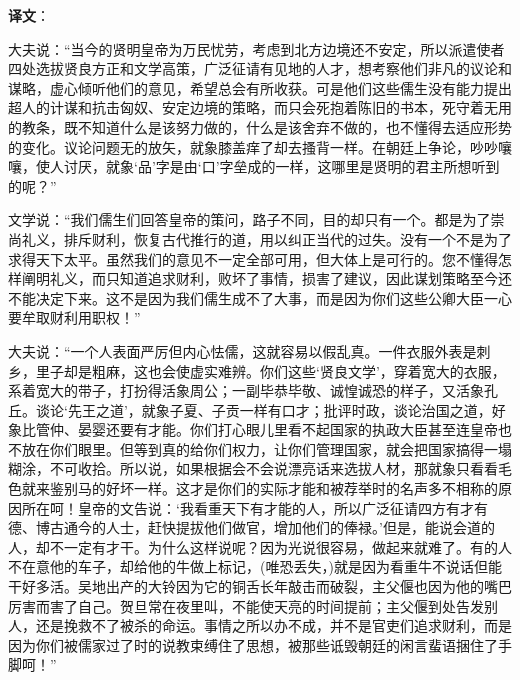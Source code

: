 \documentclass[12pt,UTF-8,openany,a4]{ctexbook}
\begin{document}
\newpage

\begin{Large}
   \noindent \textbf{译文}：
\end{Large}

\vspace{1em}

\begin{large}\yiwen
    
    大夫说：“当今的贤明皇帝为万民忧劳，考虑到北方边境还不安定，所以派遣使者四处选拔贤良方正和文学高策，广泛征请有见地的人才，想考察他们非凡的议论和谋略，虚心倾听他们的意见，希望总会有所收获。可是他们这些儒生没有能力提出超人的计谋和抗击匈奴、安定边境的策略，而只会死抱着陈旧的书本，死守着无用的教条，既不知道什么是该努力做的，什么是该舍弃不做的，也不懂得去适应形势的变化。议论问题无的放矢，就象膝盖痒了却去搔背一样。在朝廷上争论，吵吵嚷嚷，使人讨厌，就象‘品’字是由‘口’字垒成的一样，这哪里是贤明的君主所想听到的呢？”
    
    文学说：“我们儒生们回答皇帝的策问，路子不同，目的却只有一个。都是为了崇尚礼义，排斥财利，恢复古代推行的道，用以纠正当代的过失。没有一个不是为了求得天下太平。虽然我们的意见不一定全部可用，但大体上是可行的。您不懂得怎样阐明礼义，而只知道追求财利，败坏了事情，损害了建议，因此谋划策略至今还不能决定下来。这不是因为我们儒生成不了大事，而是因为你们这些公卿大臣一心要牟取财利用职权！”
    
    大夫说：“一个人表面严厉但内心怯儒，这就容易以假乱真。一件衣服外表是刺乡，里子却是粗麻，这也会使虚实难辨。你们这些‘贤良文学’，穿着宽大的衣服，系着宽大的带子，打扮得活象周公；一副毕恭毕敬、诚惶诚恐的样子，又活象孔丘。谈论‘先王之道’，就象子夏、子贡一样有口才；批评时政，谈论治国之道，好象比管仲、晏婴还要有才能。你们打心眼儿里看不起国家的执政大臣甚至连皇帝也不放在你们眼里。但等到真的给你们权力，让你们管理国家，就会把国家搞得一塌糊涂，不可收拾。所以说，如果根据会不会说漂亮话来选拔人材，那就象只看看毛色就来鉴别马的好坏一样。这才是你们的实际才能和被荐举时的名声多不相称的原因所在呵！皇帝的文告说：‘我看重天下有才能的人，所以广泛征请四方有才有德、博古通今的人士，赶快提拔他们做官，增加他们的俸禄。’但是，能说会道的人，却不一定有才干。为什么这样说呢？因为光说很容易，做起来就难了。有的人不在意他的车子，却给他的牛做上标记，(唯恐丢失，)就是因为看重牛不说话但能干好多活。吴地出产的大铃因为它的铜舌长年敲击而破裂，主父偃也因为他的嘴巴厉害而害了自己。贺旦常在夜里叫，不能使天亮的时间提前；主父偃到处告发别人，还是挽救不了被杀的命运。事情之所以办不成，并不是官吏们追求财利，而是因为你们被儒家过了时的说教束缚住了思想，被那些诋毁朝廷的闲言蜚语捆住了手脚呵！”
    

\end{large}
\end{document}

